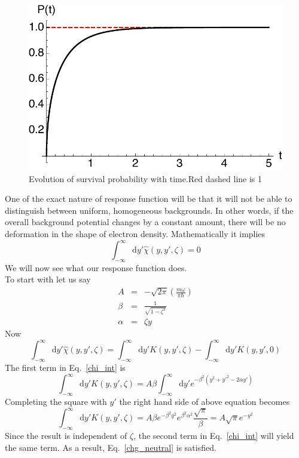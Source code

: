 \documentclass[jcp,groupaddress]{revtex4-1}
\newcommand{\eq}{\begin{equation}}
\newcommand{\qe}{\end{equation}}
\newcommand{\diff}{\mathrm{d}}
\begin{document}
\begin{figure}[H]
\begin{center}
 \includegraphics[scale=0.7]{plots/Survivalprobability.pdf}
\caption{Evolution of survival probability with time.Red dashed line is 1}
\end{center}
\end{figure}
One of the exact nature of response function will be that it will not be able to distinguish between uniform, homogeneous backgrounds. In other words, if the overall background potential changes by a constant amount, there will be no deformation in the shape of electron density. Mathematically it implies 
\eq\label{chg_neutral}
\int_{-\infty}^{\infty} \diff y' \hat{\chi}(y, y', \zeta) = 0
\qe
We will now see what our response function does.\\
To start with let us say
\begin{eqnarray}
A &=& -\sqrt{2\pi} \left( \frac{m \omega}{\pi \hbar}\right) \\
\beta &=& \frac{1}{\sqrt{1-\zeta^2}} \\
\alpha &=& \zeta y
\end{eqnarray}
Now
\eq\label{chi_int}
\int_{-\infty}^{\infty} \diff y' \hat{\chi}(y, y', \zeta) =\int_{-\infty}^{\infty} \diff y' K(y, y', \zeta) -\int_{-\infty}^{\infty} \diff y' K(y, y', 0) 
\qe
The first term in Eq.~\eqref{chi_int} is 
\eq
\int_{-\infty}^{\infty} \diff y' K(y, y', \zeta) = A \beta \int_{-\infty}^{\infty} \diff y' e^{-\beta^2(y^2+{y'}^2- 2\alpha y')} 
\qe
Completing the square with $y'$ the right hand side of above equation becomes 
\eq
\int_{-\infty}^{\infty} \diff y' K(y, y', \zeta) = A \beta  e^{-\beta^2 y^2} e^{\beta^2 \alpha^2}\frac{\sqrt{\pi}}{\beta}=A\sqrt{\pi} e^{-{y}^2}
\qe
Since the result is independent of $\zeta$, the second term in Eq.~\eqref{chi_int} will yield the same term. As a result, Eq.~\eqref{chg_neutral} is satisfied. 
\end{document}
